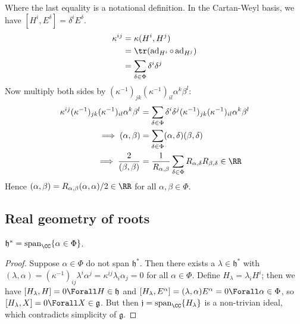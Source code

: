 \documentclass{jknotes}
\begin{document}
Where the last equality is a notational definition. In the Cartan-Weyl basis, we have \([H^i,E^\delta] = \delta^iE^\delta\).
\begin{align}
    \kappa^{ij} &= \kappa(H^i,H^j) \\
    &= \tr(\operatorname{ad}_{H^i}\circ\operatorname{ad}_{H^j}) \\
    &= \sum_{\delta\in\Phi} \delta^i\delta^j
\end{align}
Now multiply both sides by \((\kappa^{-1})_{jk}(\kappa^{-1})_{il}\alpha^k\beta^l\):
\begin{align}
    \kappa^{ij}(\kappa^{-1})_{jk}(\kappa^{-1})_{il}\alpha^k\beta^l &= \sum_{\delta\in\Phi} \delta^i\delta^j (\kappa^{-1})_{jk}(\kappa^{-1})_{il}\alpha^k\beta^l \\
    \implies (\alpha,\beta) &= \sum_{\delta\in\Phi}(\alpha,\delta)(\beta,\delta) \\
    \implies \frac{2}{(\beta,\beta)} &= \frac{1}{R_{\alpha,\beta}} \sum_{\delta\in\Phi} R_{\alpha,\delta}R_{\beta,\delta} \in \RR
\end{align}
Hence \((\alpha,\beta) = R_{\alpha,\beta}(\alpha,\alpha)/2 \in \RR\) for all \(\alpha,\beta\in\Phi\).

\subsection{Real geometry of roots}

\begin{lemma}
    \(\mathfrak{h}^* = \operatorname{span}_\CC\{\alpha\in \Phi\}\).
\end{lemma}
\begin{proof}
    Suppose \(\alpha \in \Phi\) do not span \(\mathfrak{h}^*\). Then there exists a \(\lambda \in \mathfrak{h}^*\) with \((\lambda,\alpha) = (\kappa^{-1})_{ij}\lambda^i\alpha^j = \kappa^{ij}\lambda_i\alpha_j = 0\) for all \(\alpha \in \Phi\). Define \(H_\lambda = \lambda_iH^i\); then we have \([H_\lambda,H] = 0 \Forall H \in \mathfrak{h}\) and \([H_\lambda,E^\alpha] = (\lambda,\alpha)E^\alpha = 0 \Forall \alpha \in \Phi\), so \([H_\lambda,X] = 0 \Forall X \in \mathfrak{g}\). But then \(\mathfrak{j} = \operatorname{span}_\CC\{H_\lambda\}\) is a non-trivian ideal, which contradicts simplicity of \(\mathfrak{g}\).
\end{proof}
\end{document}
